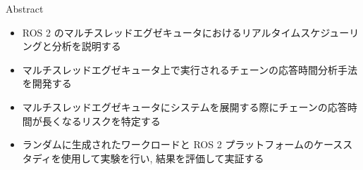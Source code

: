 
\begin{frame}{Abstract}
    \begin{itemize}
        \item ROS 2 のマルチスレッドエグゼキュータにおけるリアルタイムスケジューリングと分析を説明する
        \item マルチスレッドエグゼキュータ上で実行されるチェーンの応答時間分析手法を開発する
        \item マルチスレッドエグゼキュータにシステムを展開する際にチェーンの応答時間が長くなるリスクを特定する
        \item ランダムに生成されたワークロードと ROS 2 プラットフォームのケーススタディを使用して実験を行い, 結果を評価して実証する
    \end{itemize}
\end{frame}
